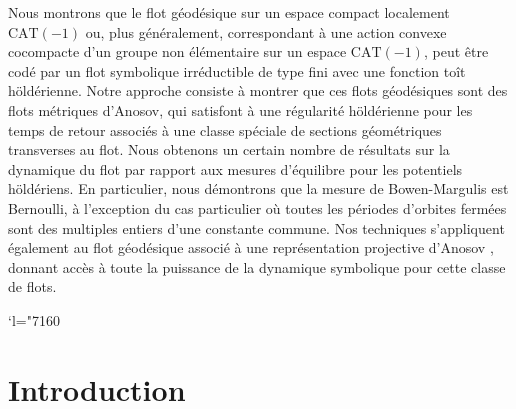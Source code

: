 \documentclass[JEP,XML,SOM,Unicode,NoFloatCountersInSection]{cedram}
\newcommand{\Changel}{\mathcode`l="7160}
\theoremstyle{definition}
\numberwithin{equation}{section}
\begin{document}




\begin{altabstract}
Nous montrons que le flot géodésique sur un espace compact localement $\mathrm{CAT}(-1)$ ou, plus généralement, correspondant à une action convexe cocompacte d’un groupe non élémentaire sur un espace $\mathrm{CAT}(-1)$, peut être codé par un flot symbolique irréductible de type fini avec une fonction toît höldérienne. Notre approche consiste à montrer que ces flots géodésiques sont des flots métriques d'Anosov, qui satisfont à une régularité höldérienne pour les temps de retour associés à une classe spéciale de sections géométriques transverses au flot. Nous obtenons un certain nombre de résultats sur la dynamique du flot par rapport aux mesures d'équilibre pour les potentiels höldériens. En particulier, nous démontrons que la mesure de Bowen-Margulis est Bernoulli, à l'exception du cas particulier où toutes les périodes d’orbites fermées sont des multiples entiers d'une constante commune. Nos techniques s’appliquent également au flot géodésique associé à une représentation projective d’Anosov \cite{bcls}, donnant accès à toute la puissance de la dynamique symbolique pour cette classe de flots.
\end{altabstract}

\maketitle
\newpage
\tableofcontents
\mainmatter

\vspace*{-\baselineskip}\vskip0pt
\Changel
\section{Introduction}
\end{document}
